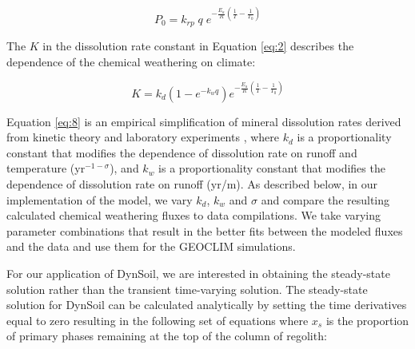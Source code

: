 \documentclass[11pt,letterpaper]{article}
\begin{document}
\begin{equation}
    P_{0} = k_{rp}\;q\;e^{-\frac{E_{a}}{R}\left(\frac{1}{T}-\frac{1}{T_{0}}\right)}
    \label{eq:6}
\end{equation}


The $K$ in the dissolution rate constant in Equation \ref{eq:2} describes the dependence of the chemical weathering on climate:

\begin{equation}
    K = k_{d}\left(1-e^{-k_{w}q}\right)e^{-\frac{E_{a}}{R}\left(\frac{1}{T}-\frac{1}{T_{0}}\right)}
    \label{eq:8}
\end{equation}

\noindent
Equation \ref{eq:8} is an empirical simplification of mineral dissolution rates derived from kinetic theory and laboratory experiments \citep{West2012a}, where $k_{d}$ is a proportionality constant that modifies the dependence of dissolution rate on runoff and temperature (yr$^{-1-\sigma}$), and $k_{w}$ is a proportionality constant that modifies the dependence of dissolution rate on runoff (yr/m). As described below, in our implementation of the model, we vary $k_{d}$, $k_{w}$ and $\sigma$ and compare the resulting calculated chemical weathering fluxes to data compilations. We take varying parameter combinations that result in the better fits between the modeled fluxes and the data and use them for the GEOCLIM simulations.

For our application of DynSoil, we are interested in obtaining the steady-state solution rather than the transient time-varying solution. The steady-state solution for DynSoil can be calculated analytically by setting the time derivatives equal to zero resulting in the following set of equations where $x_s$ is the proportion of primary phases remaining at the top of the column of regolith:
\end{document}
